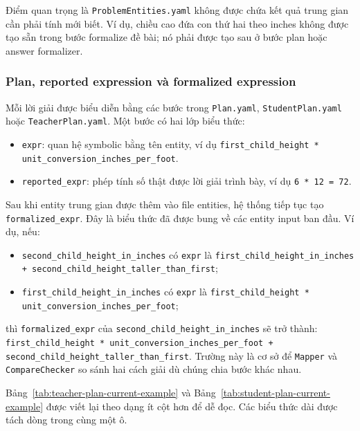 \documentclass[12pt,a4paper]{article}
\begin{document}
Điểm quan trọng là \texttt{ProblemEntities.yaml} không được chứa kết quả trung
gian cần phải tính mới biết. Ví dụ, chiều cao đứa con thứ hai theo inches không
được tạo sẵn trong bước formalize đề bài; nó phải được tạo sau ở bước plan hoặc
answer formalizer.

\subsubsection{Plan, reported expression và formalized expression}

Mỗi lời giải được biểu diễn bằng các bước trong \texttt{Plan.yaml},
\texttt{StudentPlan.yaml} hoặc \texttt{TeacherPlan.yaml}. Một bước có hai lớp
biểu thức:

\begin{itemize}[leftmargin=*]
    \item \texttt{expr}: quan hệ symbolic bằng tên entity, ví dụ
    \texttt{first\_child\_height * unit\_conversion\_inches\_per\_foot}.
    \item \texttt{reported\_expr}: phép tính số thật được lời giải trình bày,
    ví dụ \texttt{6 * 12 = 72}.
\end{itemize}

Sau khi entity trung gian được thêm vào file entities, hệ thống tiếp tục tạo
\texttt{formalized\_expr}. Đây là biểu thức đã được bung về các entity input
ban đầu. Ví dụ, nếu:

\begin{itemize}[leftmargin=*]
    \item \texttt{second\_child\_height\_in\_inches} có \texttt{expr} là
    \texttt{first\_child\_height\_in\_inches + second\_child\_height\_taller\_than\_first};
    \item \texttt{first\_child\_height\_in\_inches} có \texttt{expr} là
    \texttt{first\_child\_height * unit\_conversion\_inches\_per\_foot};
\end{itemize}

thì \texttt{formalized\_expr} của
\texttt{second\_child\_height\_in\_inches} sẽ trở thành:
\texttt{first\_child\_height * unit\_conversion\_inches\_per\_foot +
second\_child\_height\_taller\_than\_first}. Trường này là cơ sở để
\texttt{Mapper} và \texttt{CompareChecker} so sánh hai cách giải dù chúng chia
bước khác nhau.

Bảng~\ref{tab:teacher-plan-current-example} và
Bảng~\ref{tab:student-plan-current-example} được viết lại theo dạng ít cột hơn
để dễ đọc. Các biểu thức dài được tách dòng trong cùng một ô.
\end{document}
